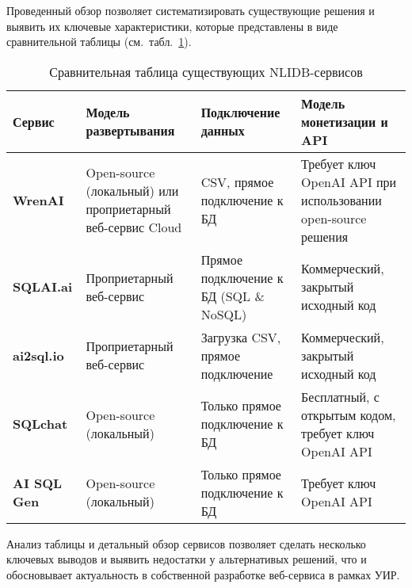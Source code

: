 Проведенный обзор позволяет систематизировать существующие решения и выявить их
ключевые характеристики, которые представлены в виде сравнительной таблицы
(см.~табл.~\ref{table:services_comparison}).

\begin{table}[ht]
      \caption{Сравнительная таблица существующих NLIDB-сервисов}\label{table:services_comparison}
      \begin{tabularx}{\linewidth}{|>{\bfseries}l|X|X|X|}
            \hline
            \textbf{Сервис} & \textbf{Модель развертывания}                              & \textbf{Подключение данных}                & \textbf{Модель монетизации и API}                             \\
            \hline
            WrenAI          & Open-source (локальный) или проприетарный веб-сервис Cloud & CSV, прямое подключение к БД               & Требует ключ OpenAI API при использовании open-source решения \\
            \hline
            SQLAI.ai        & Проприетарный веб-сервис                                   & Прямое подключение к БД (SQL     \& NoSQL) & Коммерческий, закрытый исходный код                           \\
            \hline
            ai2sql.io       & Проприетарный веб-сервис                                   & Загрузка CSV, прямое подключение           & Коммерческий, закрытый исходный код                           \\
            \hline
            SQLchat         & Open-source (локальный)                                    & Только прямое подключение к БД             & Бесплатный, с открытым кодом, требует ключ OpenAI API         \\
            \hline
            AI SQL Gen      & Open-source (локальный)                                    & Только прямое подключение к БД             & Требует ключ OpenAI API                                       \\
            \hline
      \end{tabularx}
\end{table}

Анализ таблицы и детальный обзор сервисов позволяет сделать несколько ключевых выводов
и выявить недостатки у альтернативых решений, что и обосновывает актуальность в собственной разработке
веб-сервиса в рамках УИР.

